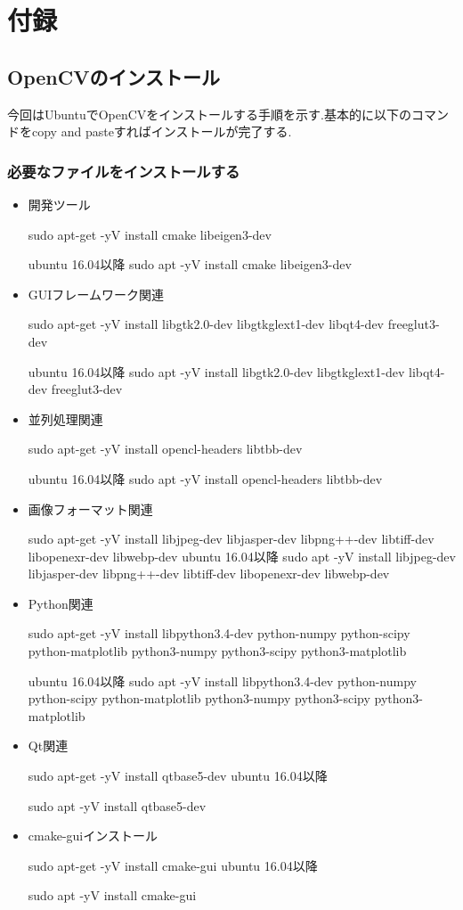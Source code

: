 \documentclass[12pt,oneside]{sotsuken_paper}
\begin{document}
\chapter*{付録}
\section{OpenCVのインストール}
今回はUbuntuでOpenCVをインストールする手順を示す.基本的に以下のコマンドをcopy and pasteすればインストールが完了する.
\subsection{必要なファイルをインストールする}
\begin{itemize}
\item 開発ツール

sudo apt-get -yV install cmake libeigen3-dev

ubuntu 16.04以降
sudo apt -yV install cmake libeigen3-dev

\item GUIフレームワーク関連

sudo apt-get -yV install libgtk2.0-dev libgtkglext1-dev libqt4-dev freeglut3-dev


ubuntu 16.04以降
sudo apt -yV install libgtk2.0-dev libgtkglext1-dev libqt4-dev freeglut3-dev

\item 並列処理関連

sudo apt-get -yV install opencl-headers libtbb-dev

ubuntu 16.04以降
sudo apt -yV install opencl-headers libtbb-dev

\item 画像フォーマット関連

sudo apt-get -yV install libjpeg-dev libjasper-dev libpng++-dev libtiff-dev libopenexr-dev libwebp-dev
ubuntu 16.04以降
sudo apt -yV install libjpeg-dev libjasper-dev libpng++-dev libtiff-dev libopenexr-dev libwebp-dev


\item Python関連

sudo apt-get -yV install libpython3.4-dev python-numpy python-scipy python-matplotlib python3-numpy python3-scipy python3-matplotlib

ubuntu 16.04以降
sudo apt -yV install libpython3.4-dev python-numpy python-scipy python-matplotlib python3-numpy python3-scipy python3-matplotlib

\item Qt関連

sudo apt-get -yV install qtbase5-dev
ubuntu 16.04以降

sudo apt -yV install qtbase5-dev

\item cmake-guiインストール

sudo apt-get -yV install cmake-gui
ubuntu 16.04以降

sudo apt -yV install cmake-gui

\end{itemize}
\end{document}
